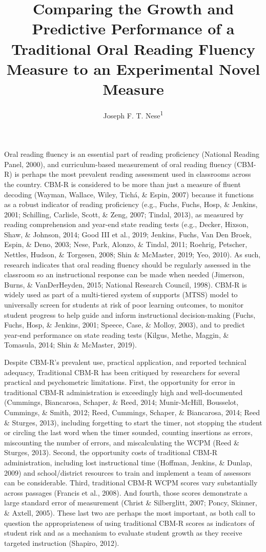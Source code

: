 \documentclass[
  english,
  man, fleqn, noextraspace]{apa6}
\title{Comparing the Growth and Predictive Performance of a Traditional Oral Reading Fluency Measure to an Experimental Novel Measure}
\author{Joseph F. T. Nese\textsuperscript{1}}
\date{}
\affiliation{\vspace{0.5cm}\textsuperscript{1} University of Oregon}
\begin{document}
\maketitle

Oral reading fluency is an essential part of reading proficiency (National Reading Panel, 2000), and curriculum-based measurement of oral reading fluency (CBM-R) is perhaps the most prevalent reading assessment used in classrooms across the country. CBM-R is considered to be more than just a measure of fluent decoding (Wayman, Wallace, Wiley, Tichá, \& Espin, 2007) because it functions as a robust indicator of reading proficiency (e.g., Fuchs, Fuchs, Hosp, \& Jenkins, 2001; Schilling, Carlisle, Scott, \& Zeng, 2007; Tindal, 2013), as measured by reading comprehension and year-end state reading tests (e.g., Decker, Hixson, Shaw, \& Johnson, 2014; Good III et al., 2019; Jenkins, Fuchs, Van Den Broek, Espin, \& Deno, 2003; Nese, Park, Alonzo, \& Tindal, 2011; Roehrig, Petscher, Nettles, Hudson, \& Torgesen, 2008; Shin \& McMaster, 2019; Yeo, 2010). As such, research indicates that oral reading fluency should be regularly assessed in the classroom so an instructional response can be made when needed (Jimerson, Burns, \& VanDerHeyden, 2015; National Research Council, 1998). CBM-R is widely used as part of a multi-tiered system of supports (MTSS) model to universally screen for students at risk of poor learning outcomes, to monitor student progress to help guide and inform instructional decision-making (Fuchs, Fuchs, Hosp, \& Jenkins, 2001; Speece, Case, \& Molloy, 2003), and to predict year-end performance on state reading tests (Kilgus, Methe, Maggin, \& Tomasula, 2014; Shin \& McMaster, 2019).

Despite CBM-R's prevalent use, practical application, and reported technical adequacy, Traditional CBM-R has been critiqued by researchers for several practical and psychometric limitations. First, the opportunity for error in traditional CBM-R administration is exceedingly high and well-documented (Cummings, Biancarosa, Schaper, \& Reed, 2014; Munir-McHill, Bousselot, Cummings, \& Smith, 2012; Reed, Cummings, Schaper, \& Biancarosa, 2014; Reed \& Sturges, 2013), including forgetting to start the timer, not stopping the student or circling the last word when the timer sounded, counting insertions as errors, miscounting the number of errors, and miscalculating the WCPM (Reed \& Sturges, 2013). Second, the opportunity costs of traditional CBM-R administration, including lost instructional time (Hoffman, Jenkins, \& Dunlap, 2009) and school/district resources to train and implement a team of assessors can be considerable. Third, traditional CBM-R WCPM scores vary substantially across passages (Francis et al., 2008). And fourth, those scores demonstrate a large standard error of measurement (Christ \& Silberglitt, 2007; Poncy, Skinner, \& Axtell, 2005). These last two are perhaps the most important, as both call to question the appropriateness of using traditional CBM-R scores as indicators of student risk and as a mechanism to evaluate student growth as they receive targeted instruction (Shapiro, 2012).
\end{document}
